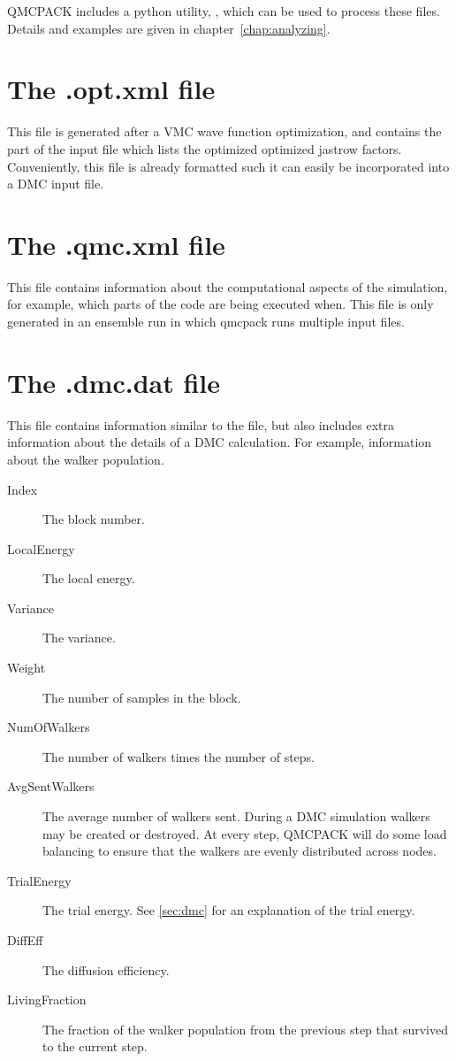 QMCPACK includes a python utility, , which can be used to process these files. Details and examples are given in chapter~\ref{chap:analyzing}.
\section{The .opt.xml file}
\label{sec:optxml_file}
This file is generated after a VMC wave function optimization, and contains the part of the input file which lists the optimized optimized jastrow factors.
Conveniently, this file is already formatted such it can easily be incorporated into a DMC input file.

\section{The .qmc.xml file}
\label{sec:qmc_file}
This file contains information about the computational aspects of the simulation, for example, which parts of the code are being executed when. This file is only generated in an ensemble run in which qmcpack runs multiple input files.

\section{The .dmc.dat file}
\label{sec:dmc_file}
This file contains information similar to the  file, but also includes extra information about the details of a DMC calculation. For example, information about the walker population.

\begin{description}
\item[Index] The block number.
\item[LocalEnergy] The local energy.
\item[Variance] The variance.
\item[Weight] The number of samples in the block.
\item[NumOfWalkers] The number of walkers times the number of steps.
\item[AvgSentWalkers] The average number of walkers sent. During a DMC simulation walkers may be created or destroyed. At every step, QMCPACK will do some load balancing to ensure that the walkers are evenly distributed across nodes.
\item[TrialEnergy] The trial energy. See \ref{sec:dmc} for an explanation of the trial energy.
\item[DiffEff] The diffusion efficiency.
\item[LivingFraction] The fraction of the walker population from the previous step that survived to the current step.
\end{description}


